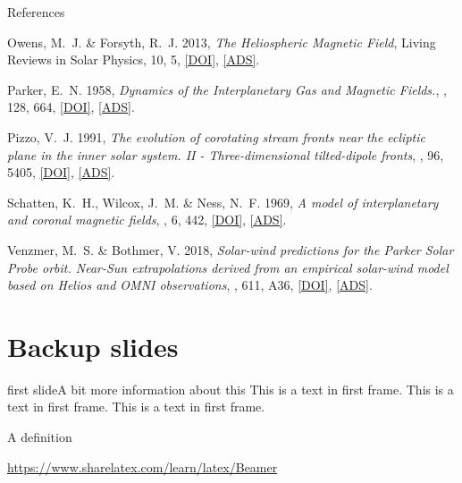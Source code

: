 \documentclass[11pt,aspectratio=1610]{beamer}	%
\begin{document}
\begin{frame}[t,allowframebreaks]{References}
\begin{thebibliography}{10}
			{Owens}, M.~J. \& {Forsyth}, R.~J. 2013, \emph{{The Heliospheric Magnetic
			Field}}, Living Reviews in Solar Physics, 10, 5,
			\href{http://dx.doi.org/10.12942/lrsp-2013-5}{[DOI]},
			\href{http://adsabs.harvard.edu/abs/2013LRSP...10....5O}{[ADS]}.
		
			{Parker}, E.~N. 1958, \emph{{Dynamics of the Interplanetary Gas and Magnetic Fields.}}, \apj, 128, 664, \href{http://dx.doi.org/10.1086/146579}{[DOI]}, \href{http://adsabs.harvard.edu/abs/1958ApJ...128..664P}{[ADS]}.

			{Pizzo}, V.~J. 1991, \emph{{The evolution of corotating stream fronts near the
			ecliptic plane in the inner solar system. II - Three-dimensional
			tilted-dipole fronts}}, \jgr, 96, 5405,
			\href{http://dx.doi.org/10.1029/91JA00155}{[DOI]},
			\href{http://adsabs.harvard.edu/abs/1991JGR....96.5405P}{[ADS]}.
			
			{Schatten}, K.~H., {Wilcox}, J.~M. \& {Ness}, N.~F. 1969, \emph{{A model of
			interplanetary and coronal magnetic fields}}, \solphys, 6, 442,
			\href{http://dx.doi.org/10.1007/BF00146478}{[DOI]},
			\href{http://adsabs.harvard.edu/abs/1969SoPh....6..442S}{[ADS]}.

			{Venzmer}, M.~S. \& {Bothmer}, V. 2018, \emph{{Solar-wind predictions for the
			Parker Solar Probe orbit. Near-Sun extrapolations derived from an empirical
			solar-wind model based on Helios and OMNI observations}}, \aap, 611, A36,
			\href{http://dx.doi.org/10.1051/0004-6361/201731831}{[DOI]},
			\href{http://adsabs.harvard.edu/abs/2018A\%26A...611A..36V}{[ADS]}.

	\end{thebibliography}
\end{frame}


\appendix

\section{Backup slides}

\begin{frame}[c]{first slide}{A bit more information about this}
	This is a text in first frame. \pause This is a text in first frame. This is a text in first frame.
	\begin{definition}
		A definition
	\end{definition}
	\url{https://www.sharelatex.com/learn/latex/Beamer}
\end{frame}
\end{document}

